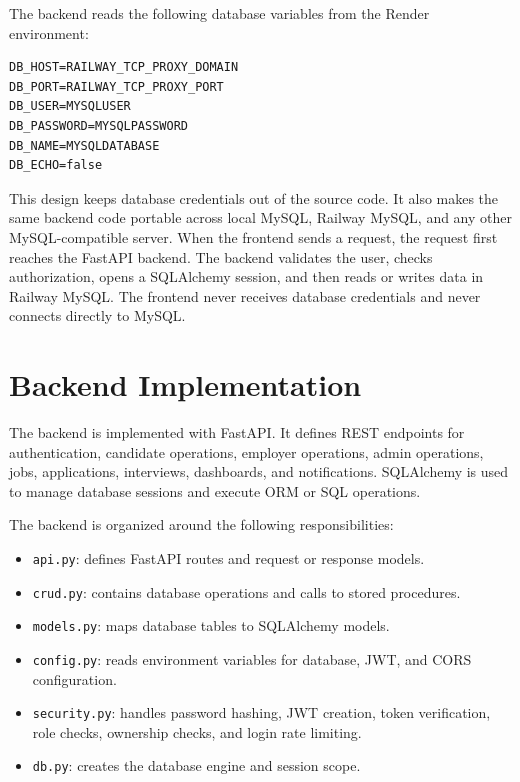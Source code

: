 \documentclass[12pt,a4paper]{report}
\begin{document}
The backend reads the following database variables from the Render environment:

\begin{lstlisting}[caption={Database variables used by the backend}]
DB_HOST=RAILWAY_TCP_PROXY_DOMAIN
DB_PORT=RAILWAY_TCP_PROXY_PORT
DB_USER=MYSQLUSER
DB_PASSWORD=MYSQLPASSWORD
DB_NAME=MYSQLDATABASE
DB_ECHO=false
\end{lstlisting}

This design keeps database credentials out of the source code. It also makes the same backend code portable across local MySQL, Railway MySQL, and any other MySQL-compatible server. When the frontend sends a request, the request first reaches the FastAPI backend. The backend validates the user, checks authorization, opens a SQLAlchemy session, and then reads or writes data in Railway MySQL. The frontend never receives database credentials and never connects directly to MySQL.

\section{Backend Implementation}

The backend is implemented with FastAPI. It defines REST endpoints for authentication, candidate operations, employer operations, admin operations, jobs, applications, interviews, dashboards, and notifications. SQLAlchemy is used to manage database sessions and execute ORM or SQL operations.

The backend is organized around the following responsibilities:

\begin{itemize}[leftmargin=1.5cm]
  \item \texttt{api.py}: defines FastAPI routes and request or response models.
  \item \texttt{crud.py}: contains database operations and calls to stored procedures.
  \item \texttt{models.py}: maps database tables to SQLAlchemy models.
  \item \texttt{config.py}: reads environment variables for database, JWT, and CORS configuration.
  \item \texttt{security.py}: handles password hashing, JWT creation, token verification, role checks, ownership checks, and login rate limiting.
  \item \texttt{db.py}: creates the database engine and session scope.
\end{itemize}
\end{document}
